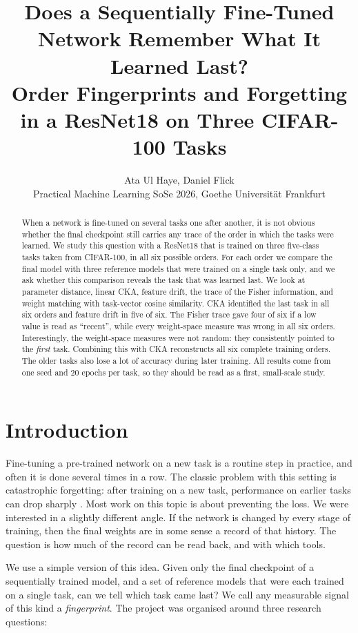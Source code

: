 \documentclass[11pt,a4paper]{article}
\title{Does a Sequentially Fine-Tuned Network Remember What It Learned Last?\\[0.3em]
\large Order Fingerprints and Forgetting in a ResNet18 on Three CIFAR-100 Tasks}
\author{Ata Ul Haye, Daniel Flick\\[0.2em]Practical Machine Learning SoSe 2026, Goethe Universität Frankfurt}
\date{}
\begin{document}
\maketitle

\begin{abstract}
\noindent
When a network is fine-tuned on several tasks one after another, it is not obvious whether the final checkpoint still carries any trace of the order in which the tasks were learned. We study this question with a ResNet18 that is trained on three five-class tasks taken from CIFAR-100, in all six possible orders. For each order we compare the final model with three reference models that were trained on a single task only, and we ask whether this comparison reveals the task that was learned last. We look at parameter distance, linear CKA, feature drift, the trace of the Fisher information, and weight matching with task-vector cosine similarity. CKA identified the last task in all six orders and feature drift in five of six. The Fisher trace gave four of six if a low value is read as ``recent'', while every weight-space measure was wrong in all six orders. Interestingly, the weight-space measures were not random: they consistently pointed to the \emph{first} task. Combining this with CKA reconstructs all six complete training orders. The older tasks also lose a lot of accuracy during later training. All results come from one seed and 20 epochs per task, so they should be read as a first, small-scale study.
\end{abstract}

\section{Introduction}

Fine-tuning a pre-trained network on a new task is a routine step in practice, and often it is done several times in a row. The classic problem with this setting is catastrophic forgetting: after training on a new task, performance on earlier tasks can drop sharply \cite{mccloskey1989}. Most work on this topic is about preventing the loss. We were interested in a slightly different angle. If the network is changed by every stage of training, then the final weights are in some sense a record of that history. The question is how much of the record can be read back, and with which tools.

We use a simple version of this idea. Given only the final checkpoint of a sequentially trained model, and a set of reference models that were each trained on a single task, can we tell which task came last? We call any measurable signal of this kind a \emph{fingerprint}. The project was organised around three research questions:
\end{document}
